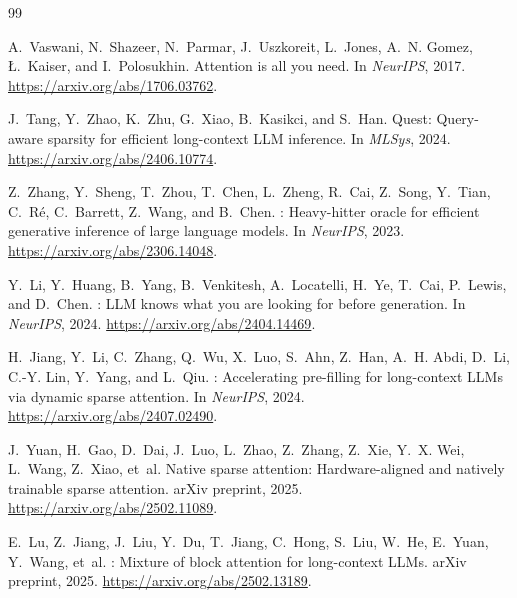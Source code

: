 \documentclass[11pt]{article}
\theoremstyle{remark}
\begin{document}

\begin{thebibliography}{99}

A.~Vaswani, N.~Shazeer, N.~Parmar, J.~Uszkoreit, L.~Jones, A.~N. Gomez, {\L}.~Kaiser, and I.~Polosukhin.
\newblock Attention is all you need.
\newblock In \emph{NeurIPS}, 2017.
\newblock \url{https://arxiv.org/abs/1706.03762}.

J.~Tang, Y.~Zhao, K.~Zhu, G.~Xiao, B.~Kasikci, and S.~Han.
\newblock Quest: Query-aware sparsity for efficient long-context {LLM} inference.
\newblock In \emph{MLSys}, 2024.
\newblock \url{https://arxiv.org/abs/2406.10774}.

Z.~Zhang, Y.~Sheng, T.~Zhou, T.~Chen, L.~Zheng, R.~Cai, Z.~Song, Y.~Tian, C.~R\'e, C.~Barrett, Z.~Wang, and B.~Chen.
: Heavy-hitter oracle for efficient generative inference of large language models.
\newblock In \emph{NeurIPS}, 2023.
\newblock \url{https://arxiv.org/abs/2306.14048}.

Y.~Li, Y.~Huang, B.~Yang, B.~Venkitesh, A.~Locatelli, H.~Ye, T.~Cai, P.~Lewis, and D.~Chen.
: {LLM} knows what you are looking for before generation.
\newblock In \emph{NeurIPS}, 2024.
\newblock \url{https://arxiv.org/abs/2404.14469}.

H.~Jiang, Y.~Li, C.~Zhang, Q.~Wu, X.~Luo, S.~Ahn, Z.~Han, A.~H. Abdi, D.~Li, C.-Y. Lin, Y.~Yang, and L.~Qiu.
: Accelerating pre-filling for long-context {LLMs} via dynamic sparse attention.
\newblock In \emph{NeurIPS}, 2024.
\newblock \url{https://arxiv.org/abs/2407.02490}.

J.~Yuan, H.~Gao, D.~Dai, J.~Luo, L.~Zhao, Z.~Zhang, Z.~Xie, Y.~X. Wei, L.~Wang, Z.~Xiao, et~al.
\newblock Native sparse attention: Hardware-aligned and natively trainable sparse attention.
\newblock arXiv preprint, 2025.
\newblock \url{https://arxiv.org/abs/2502.11089}.

E.~Lu, Z.~Jiang, J.~Liu, Y.~Du, T.~Jiang, C.~Hong, S.~Liu, W.~He, E.~Yuan, Y.~Wang, et~al.
: Mixture of block attention for long-context {LLMs}.
\newblock arXiv preprint, 2025.
\newblock \url{https://arxiv.org/abs/2502.13189}.


\end{thebibliography}
\end{document}
